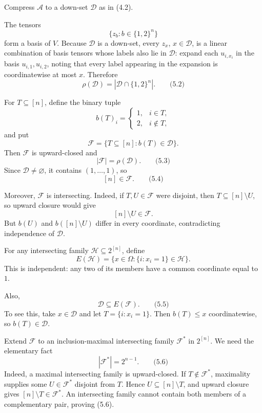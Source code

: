 \documentclass[
  11pt,
  a4paper,
]{article}
\begin{document}
Compress \(\mathcal A\) to a down-set \(\mathcal D\) as in (4.2).

The tensors \[
\{z_b:b\in\{1,2\}^n\}
\] form a basis of \(V\). Because \(\mathcal D\) is a down-set, every
\(z_x\), \(x\in\mathcal D\), is a linear combination of basis tensors
whose labels also lie in \(\mathcal D\): expand each \(u_{i,x_i}\) in
the basis \(u_{i,1},u_{i,2}\), noting that every label appearing in the
expansion is coordinatewise at most \(x\). Therefore \[
\rho(\mathcal D)=|\mathcal D\cap\{1,2\}^n|.
\qquad\text{(5.2)}
\]

For \(T\subseteq[n]\), define the binary tuple \[
b(T)_i=
\begin{cases}
1,&i\in T,\\
2,&i\notin T,
\end{cases}
\] and put \[
\mathcal F=\{T\subseteq[n]:b(T)\in\mathcal D\}.
\] Then \(\mathcal F\) is upward-closed and \[
|\mathcal F|=\rho(\mathcal D).
\qquad\text{(5.3)}
\] Since \(\mathcal D\ne\varnothing\), it contains \((1,\ldots,1)\), so
\[
[n]\in\mathcal F.
\qquad\text{(5.4)}
\]

Moreover, \(\mathcal F\) is intersecting. Indeed, if
\(T,U\in\mathcal F\) were disjoint, then \(T\subseteq[n]\setminus U\),
so upward closure would give \[
[n]\setminus U\in\mathcal F.
\] But \(b(U)\) and \(b([n]\setminus U)\) differ in every coordinate,
contradicting independence of \(\mathcal D\).

For any intersecting family \(\mathcal H\subseteq2^{[n]}\), define \[
E(\mathcal H)=
\{x\in\Omega:\{i:x_i=1\}\in\mathcal H\}.
\] This is independent: any two of its members have a common coordinate
equal to \(1\).

Also, \[
\mathcal D\subseteq E(\mathcal F).
\qquad\text{(5.5)}
\] To see this, take \(x\in\mathcal D\) and let \(T=\{i:x_i=1\}\). Then
\(b(T)\le x\) coordinatewise, so \(b(T)\in\mathcal D\).

Extend \(\mathcal F\) to an inclusion-maximal intersecting family
\(\mathcal F^\ast\) in \(2^{[n]}\). We need the elementary fact \[
|\mathcal F^\ast|=2^{n-1}.
\qquad\text{(5.6)}
\] Indeed, a maximal intersecting family is upward-closed. If
\(T\notin\mathcal F^\ast\), maximality supplies some
\(U\in\mathcal F^\ast\) disjoint from \(T\). Hence
\(U\subseteq[n]\setminus T\), and upward closure gives
\([n]\setminus T\in\mathcal F^\ast\). An intersecting family cannot
contain both members of a complementary pair, proving (5.6).
\end{document}
